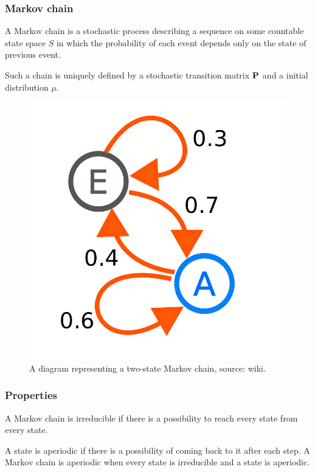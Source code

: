 \begin{frame}
	\frametitle{Markov chain}
	\begin{definition}
		A Markov chain is a stochastic process describing a sequence on some countable state space $S$ in which the probability of each event depends only on the state of previous event.
	\end{definition}
	\begin{definition}
		 Such a chain is uniquely defined by a stochastic transition matrix $\mathbf{P}$ and a initial distribution $\mu$.
	\end{definition}
	\begin{figure}[!htb]
		\includegraphics[scale=0.085]{img/Markov_diagram.png}
		\caption{A diagram representing a two-state Markov chain, source: wiki.}
	\end{figure}
\end{frame}

\begin{frame}
	\frametitle{Properties}
	\begin{definition}[Irreducibility]
		A Markov chain is irreducible if there is a possibility to reach every state from every state.
	\end{definition}

	\begin{definition}[Aperiodicity]
		A state is aperiodic if there is a possibility of coming back to it after each step. A Markov chain is aperiodic when every state is irreducible and a state is aperiodic.
	\end{definition}
	
\end{frame}

